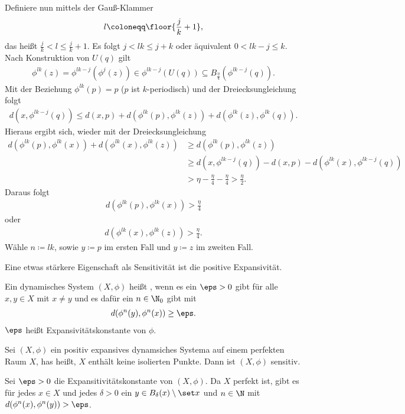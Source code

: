 \begin{beweis}
\begin{enumerate}
Definiere nun mittels der Gauß-Klammer 
\begin{align*}
  l \coloneqq \floor{ \frac j k + 1}, 
\end{align*}
das heißt $\frac j k < l \leq \frac j k +1$. Es folgt $j < lk \leq j +k $ oder äquivalent $0< lk -j\leq k$. Nach Konstruktion von $U(q)$ gilt
\begin{align*}
  \phi^{lk}(z) = \phi^{lk-j}(\phi^j(z)) \in \phi^{lk- j}(U(q))  \subseteq B_{\frac \eta 4}(\phi^{lk-j}(q)). 
\end{align*}
Mit der Beziehung $\phi^{lk}(p) = p$ ($p$ ist $k$-periodisch) und der Dreiecksungleichung folgt
\begin{align*}
  d(x, \phi^{lk- j}(q)) \leq d(x, p) + d(\phi^{lk}(p), \phi^{lk}(z)) + d(\phi^{lk}(z), \phi^{lk}(q)). 
\end{align*}
Hieraus ergibt sich, wieder mit der Dreiecksungleichung 
\begin{align*}
d(\phi^{lk}(p), \phi^{lk}(x)) + d(\phi^{lk}(x), \phi^{lk}(z)) &\geq d(\phi^{lk}(p), \phi^{lk}(z)) \\
&\geq d(x, \phi^{lk-j}(q)) - d(x, p)- d(\phi^{lk}(x), \phi^{lk-j}(q))\\
&> \eta - \frac \eta 4 - \frac \eta 4 > \frac \eta 2.      
\end{align*}
Daraus folgt
\begin{align*}
  d(\phi^{lk}(p), \phi^{lk}(x)) > \frac \eta 4
\end{align*}
oder 
\begin{align*}
  d(\phi^{lk}(x), \phi^{lk}(z)) > \frac \eta 4.
\end{align*}
Wähle $n\coloneqq lk$, sowie $y \coloneqq p$ im ersten Fall und $y\coloneqq z$ im zweiten  Fall. 
\end{enumerate}
\end{beweis}
Eine etwas stärkere Eigenschaft als Sensitivität ist die positive Expansivität.
\begin{definition}
  Ein dynamisches System $(X, \phi)$ heißt , wenn es ein $\eps > 0$ gibt für alle $x, y \in X$ mit $x \neq y$ und es dafür ein $n \in \N_0$ gibt mit 
  \begin{align*}
    d(\phi^n(y),\phi^n(x)) \geq \eps.
  \end{align*}
$\eps$ heißt Expansivitätskonstante von $\phi$.
\end{definition}
\begin{satz}
  Sei $(X, \phi)$ ein positiv expansives dynamsiches Systema auf einem perfekten Raum $X$, has heißt, $X$ enthält keine isolierten Punkte. Dann ist $(X, \phi)$ sensitiv.
\end{satz}
\begin{beweis}
  Sei $\eps >0$ die Expansitivitätskonstante von $(X, \phi)$. Da $X$ perfekt ist, gibt es für jedes $x \in X$ und jedes $\delta > 0$ ein $y \in B_\delta(x)\setminus \set x$ und $n \in \N$ mit $d(\phi^n(x), \phi^n(y)) > \eps$.
\end{beweis}